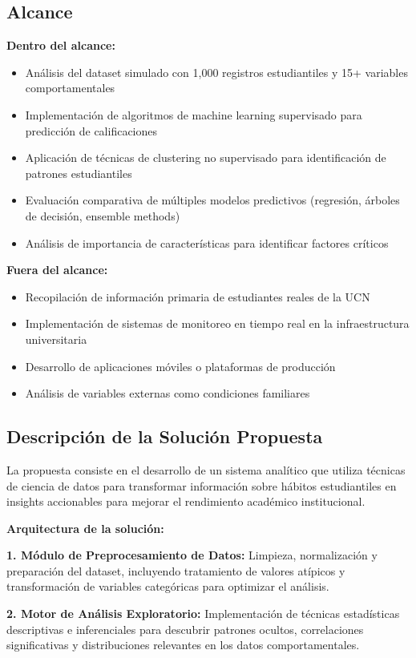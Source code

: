 \documentclass[12pt,letterpaper]{report}
\begin{document}
\subsection{Alcance}
\textbf{Dentro del alcance:}
\begin{itemize}
\item Análisis del dataset simulado con 1,000 registros estudiantiles y 15+ variables comportamentales
\item Implementación de algoritmos de machine learning supervisado para predicción de calificaciones
\item Aplicación de técnicas de clustering no supervisado para identificación de patrones estudiantiles
\item Evaluación comparativa de múltiples modelos predictivos (regresión, árboles de decisión, ensemble methods)
\item Análisis de importancia de características para identificar factores críticos
\end{itemize}
\textbf{Fuera del alcance:}
\begin{itemize}
\item Recopilación de información primaria de estudiantes reales de la UCN
\item Implementación de sistemas de monitoreo en tiempo real en la infraestructura universitaria
\item Desarrollo de aplicaciones móviles o plataformas de producción
\item Análisis de variables externas como condiciones familiares
\end{itemize}

\subsection{Descripción de la Solución Propuesta}
La propuesta consiste en el desarrollo de un sistema analítico que utiliza técnicas de ciencia de datos para transformar 
información sobre hábitos estudiantiles en insights accionables para mejorar el rendimiento académico institucional.

\textbf{Arquitectura de la solución:}

\textbf{1. Módulo de Preprocesamiento de Datos:} Limpieza, normalización y preparación del dataset, incluyendo tratamiento de valores atípicos y transformación de variables categóricas para optimizar el análisis.

\textbf{2. Motor de Análisis Exploratorio:} Implementación de técnicas estadísticas descriptivas e inferenciales para descubrir patrones ocultos, correlaciones significativas y distribuciones relevantes en los datos comportamentales.
\end{document}
